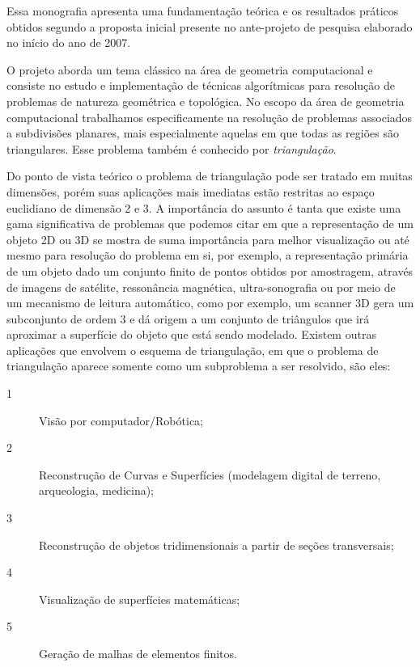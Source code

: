 \documentclass[12pt,a4paper]{book}
\begin{document}
Essa monografia apresenta uma fundamenta\c{c}\~{a}o te\'orica e os resultados pr\'aticos obtidos segundo a proposta inicial presente no ante-projeto de pesquisa elaborado no in\'icio do ano de 2007.

O projeto aborda um tema cl\'assico na \'area de geometria computacional e consiste no estudo e implementa\c{c}\~ao de t\'ecnicas algor\'itmicas para resolu\c{c}\~{a}o de problemas de natureza geom\'etrica e topol\'ogica. No
escopo da \'area de geometria computacional trabalhamos especificamente na resolu\c{c}\~{a}o de problemas associados a subdivis\~oes planares, mais especialmente aquelas em que todas as regi\~oes s\~ao triangulares. Esse problema tamb\'em \'e conhecido por \textit{triangula\c{c}\~{a}o}.

Do ponto de vista te\'orico o problema de triangula\c{c}\~ao pode ser tratado em muitas dimens\~oes, por\'em suas aplica\c{c}\~{o}es mais imediatas est\~ao restritas  ao espa\c{c}o euclidiano de dimens\~ao 2 e 3. A import\^ancia do assunto \'e tanta que existe uma gama significativa de problemas que podemos citar em que a representa\c{c}\~{a}o de um objeto 2D ou 3D se mostra de suma import\^ancia para melhor visualiza\c{c}\~{a}o ou at\'e mesmo para resolu\c{c}\~{a}o do problema em si, por exemplo, a representa\c{c}\~{a}o prim\'aria de um objeto dado um conjunto finito de pontos obtidos por amostragem, atrav\'es de imagens de sat\'elite, resson\^ancia magn\'etica, ultra-sonografia ou por meio de um mecanismo de leitura autom\'atico, como por exemplo, um scanner 3D gera um subconjunto de ordem 3 e d\'a origem a um conjunto de tri\^angulos que ir\'a aproximar a superf\'icie do objeto que est\'a sendo modelado. Existem outras aplica\c{c}\~{o}es que envolvem o esquema de triangula\c{c}\~{a}o, em que o problema de triangula\c{c}\~{a}o aparece somente como um subproblema a ser resolvido, s\~ao eles:

\begin{description}

\item[1] Vis\~ao por computador/Rob\'otica;
\item[2] Reconstru\c{c}\~{a}o de Curvas e Superf\'icies (modelagem digital de terreno, arqueologia, medicina);
\item[3] Reconstru\c{c}\~{a}o de objetos tridimensionais a partir de se\c{c}\~{o}es transversais;
\item[4] Visualiza\c{c}\~{a}o de superf\'icies matem\'aticas;
\item[5] Gera\c{c}\~{a}o de malhas de elementos finitos.

\end{description}
\end{document}

